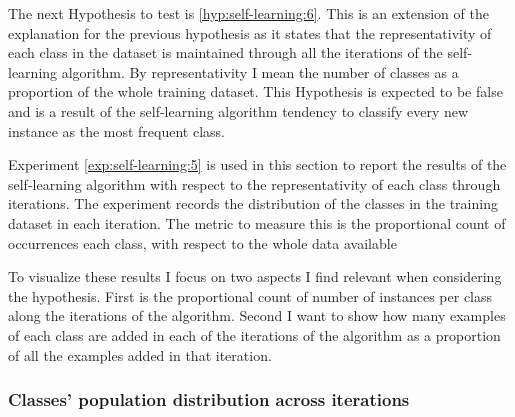 The next Hypothesis to test is \ref{hyp:self-learning:6}. This is an extension
of the explanation for the previous hypothesis as it states that the
representativity of each class in the dataset is maintained through all the
iterations of the self-learning algorithm. By representativity I mean the
number of classes as a proportion of the whole training dataset. This
Hypothesis is expected to be false and is a result of the self-learning
algorithm tendency to classify every new instance as the most frequent class.

Experiment \ref{exp:self-learning:5} is used in this section to report the
results of the self-learning algorithm with respect to the representativity of
each class through iterations. The experiment records the distribution of the
classes in the training dataset in each iteration. The metric to measure this
is the proportional count of occurrences each class, with respect to the whole
data available

To visualize these results I focus on two aspects I find relevant when
considering the hypothesis. First is the proportional count of number of
instances per class along the iterations of the algorithm. Second I want to
show how many examples of each class are added in each of the iterations of the
algorithm as a proportion of all the examples added in that iteration.

\subsubsection{Classes' population distribution across iterations}

